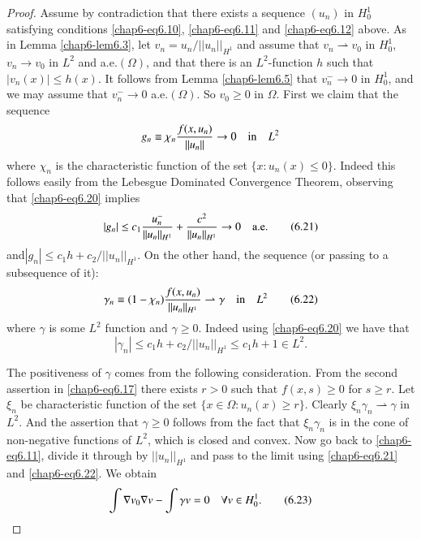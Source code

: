 \begin{proof}
Assume by contradiction that there exists a sequence $(u_{n})$ in
$H^{1}_{0}$ satisfying conditions \eqref{chap6-eq6.10},
\eqref{chap6-eq6.11} and \eqref{chap6-eq6.12} above. As in Lemma
\ref{chap6-lem6.3}, let $v_{n}=u_{n}/||u_{n}||_{H^{1}}$ and assume
that $v_{n}\rightharpoonup v_{0}$ in $H^{1}_{0}$, $v_{n}\to v_{0}$ in
$L^{2}$ and a.e.\@ $(\Omega)$, and that there is an $L^{2}$-function
$h$ such that $|v_{n}(x)|\leq h(x)$. It follows from Lemma
\ref{chap6-lem6.5} that $v^{-}_{n}\to 0$ in $H^{1}_{0}$, and we may
assume that $v^{-}_{n}\to 0$ a.e.\@ $(\Omega)$. So $v_{0}\geq 0$ in
$\Omega$. First we claim that the sequence
$$
g_{n}\equiv \chi_{n}\frac{f(x,u_{n})}{||u_{n}||}\to 0\quad\text{in}\quad L^{2}
$$
where $\chi_{n}$ is the characteristic function of the set
$\{x:u_{n}(x)\leq 0\}$. Indeed this follows easily from the Lebesgue
Dominated Convergence Theorem, observing that \eqref{chap6-eq6.20}
implies 
\begin{equation*}
|g_{n}|\leq
c_{1}\frac{u^{-}_{n}}{||u_{n}||_{H^{1}}}+\frac{c^{2}}{||u_{n}||_{H^{1}}}\to
0\quad\text{a.e.}\tag{6.21}\label{chap6-eq6.21} 
\end{equation*}
and\pageoriginale $|g_{n}|\leq c_{1}h+c_{2}/||u_{n}||_{H^{1}}$. On the
other hand, the sequence (or passing to a subsequence of it):
\begin{equation*}
\gamma_{n}\equiv
(1-\chi_{n})\frac{f(x,u_{n})}{||u_{n}||_{H^{1}}}\rightharpoonup
\gamma\quad\text{in}\quad L^{2}\tag{6.22}\label{chap6-eq6.22} 
\end{equation*}
where $\gamma$ is some $L^{2}$ function and $\gamma\geq 0$. Indeed
using \eqref{chap6-eq6.20} we have that
$$
|\gamma_{n}|\leq c_{1}h+c_{2}/||u_{n}||_{H^{1}}\leq c_{1}h+1\in L^{2}.
$$

The positiveness of $\gamma$ comes from the following
consideration. From the second assertion in \eqref{chap6-eq6.17} there
exists $r>0$ such that $f(x,s)\geq 0$ for $s\geq r$. Let $\xi_{n}$ be
characteristic function of the set $\{x\in \Omega:u_{n}(x)\geq
r\}$. Clearly $\xi_{n}\gamma_{n}\rightharpoonup \gamma$ in
$L^{2}$. And the assertion that $\gamma\geq 0$ follows from the fact
that $\xi_{n}\gamma_{n}$ is in the cone of non-negative functions of
$L^{2}$, which is closed and convex. Now go back to
\eqref{chap6-eq6.11}, divide it through by $||u_{n}||_{H^{1}}$ and
pass to the limit using \eqref{chap6-eq6.21} and
\eqref{chap6-eq6.22}. We obtain 
\begin{equation*}
\int\nabla v_{0}\nabla v-\int \gamma v=0\quad \forall v\in
H^{1}_{0}.\tag{6.23}\label{chap6-eq6.23} 
\end{equation*}


\end{proof}
